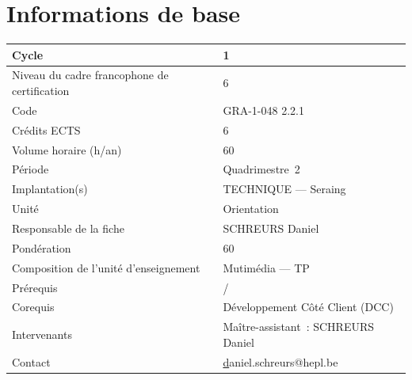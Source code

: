 


\tableofcontents
{}


\clearpage
{}
\section{Informations de base}

\begin{table}[H]
    \begin{tabular}{|l|l|}
        \hline
        Cycle                                        & 1                                  \\ \hline
        Niveau du cadre francophone de certification & 6                                  \\ \hline
        Code                                         & GRA-1-048 2.2.1                    \\ \hline
        Crédits ECTS                                 & 6                                  \\ \hline
        Volume horaire (h/an)                        & 60                                 \\ \hline
        Période                                      & Quadrimestre~2                     \\ \hline
        Implantation(s)                              & TECHNIQUE — Seraing                \\ \hline
        Unité                                        & Orientation                        \\ \hline
        Responsable de la fiche                      & SCHREURS Daniel                    \\ \hline
        Pondération                                  & 60                                 \\ \hline
        Composition de l'unité d'enseignement        & Mutimédia — TP                     \\ \hline
        Prérequis                                    & /                                  \\ \hline
        Corequis                                     & Développement Côté Client (DCC)    \\ \hline
        Intervenants                                 & Maître-assistant~: SCHREURS Daniel \\ \hline
        Contact                                      & {\ul daniel.schreurs@hepl.be}      \\ \hline
    \end{tabular}
\end{table}

